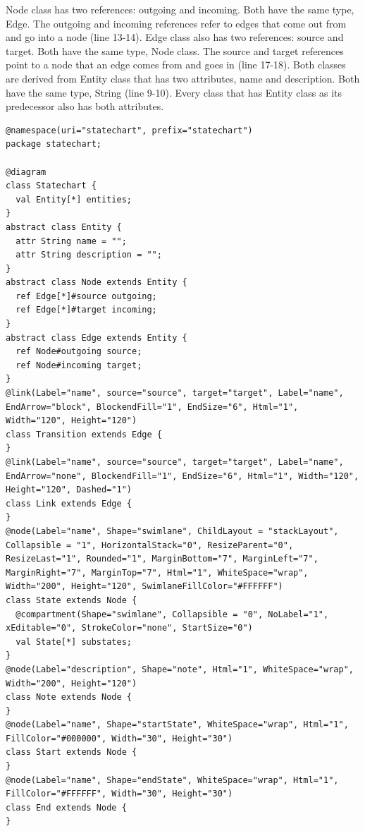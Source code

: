 \documentclass[conference]{IEEEtran}
\begin{document}
Node class has two references: outgoing and incoming. Both have the same type, Edge. The outgoing and incoming references refer to edges that come out from and go into a node (line 13-14). Edge class also has two references: source and target. Both have the same type, Node class. The source and target references point to a node that an edge comes from and goes in (line 17-18). Both classes are derived from Entity class that has two attributes, name and description. Both have the same type, String (line 9-10). Every class that has Entity class as its predecessor also has both attributes.        

\begin{lstlisting}[style=interfaces,caption={A definition of Start State derived from Node class using Emfatic and Eugenia-like annotations.},label=metamodel]
@namespace(uri="statechart", prefix="statechart")
package statechart;

@diagram
class Statechart {
  val Entity[*] entities;
}
abstract class Entity {
  attr String name = "";
  attr String description = "";
}
abstract class Node extends Entity {
  ref Edge[*]#source outgoing;
  ref Edge[*]#target incoming;
}
abstract class Edge extends Entity {
  ref Node#outgoing source;
  ref Node#incoming target;
}
@link(Label="name", source="source", target="target", Label="name", EndArrow="block", BlockendFill="1", EndSize="6", Html="1", Width="120", Height="120")
class Transition extends Edge {
}
@link(Label="name", source="source", target="target", Label="name", EndArrow="none", BlockendFill="1", EndSize="6", Html="1", Width="120", Height="120", Dashed="1")
class Link extends Edge {
}
@node(Label="name", Shape="swimlane", ChildLayout = "stackLayout", Collapsible = "1", HorizontalStack="0", ResizeParent="0", ResizeLast="1", Rounded="1", MarginBottom="7", MarginLeft="7", MarginRight="7", MarginTop="7", Html="1", WhiteSpace="wrap", Width="200", Height="120", SwimlaneFillColor="#FFFFFF")
class State extends Node {
  @compartment(Shape="swimlane", Collapsible = "0", NoLabel="1", xEditable="0", StrokeColor="none", StartSize="0")
  val State[*] substates;
}
@node(Label="description", Shape="note", Html="1", WhiteSpace="wrap", Width="200", Height="120")
class Note extends Node {
}
@node(Label="name", Shape="startState", WhiteSpace="wrap", Html="1", FillColor="#000000", Width="30", Height="30")
class Start extends Node {
}
@node(Label="name", Shape="endState", WhiteSpace="wrap", Html="1", FillColor="#FFFFFF", Width="30", Height="30")
class End extends Node {
}
\end{lstlisting} 
\end{document}
